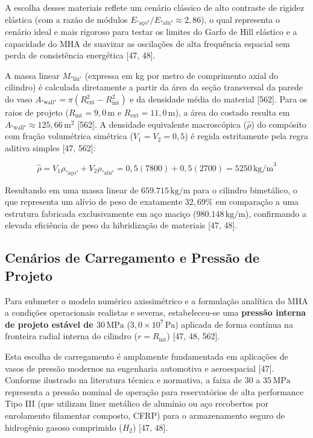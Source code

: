 A escolha desses materiais reflete um cenário clássico de alto contraste de rigidez elástica (com a razão de módulos $E_{\text{"aço"}}/E_{\text{"alu"}} \approx 2,86$), o qual representa o cenário ideal e mais rigoroso para testar os limites do Garfo de Hill elástico e a capacidade do MHA de suavizar as oscilações de alta frequência espacial sem perda de consistência energética [47, 48].

A massa linear $M_{\text{"lin"}}$ (expressa em kg por metro de comprimento axial do cilindro) é calculada diretamente a partir da área da seção transversal da parede do vaso $A_{\text{"wall"}} = \pi (R_{\text{ext}}^2 - R_{\text{int}}^2)$ e da densidade média do material [562]. Para os raios de projeto ($R_{\text{int}} = 9,0 \, \text{m}$ e $R_{\text{ext}} = 11,0 \, \text{m}$), a área do costado resulta em $A_{\text{"wall"}} \approx 125,66 \, \text{m}^2$ [562]. A densidade equivalente macroscópica ($\hat{\rho}$) do compósito com fração volumétrica simétrica ($V_1 = V_2 = 0,5$) é regida estritamente pela regra aditiva simples [47, 562]:

\begin{equation}
  \hat{\rho} = V_1 \rho_{\text{"aço"}} + V_2 \rho_{\text{"alu"}} = 0,5 (7800) + 0,5 (2700) = 5250 \, \text{kg/m}^3
  \label{eq:densidade_efetiva}
\end{equation}

Resultando em uma massa linear de $659.715 \, \text{kg/m}$ para o cilindro bimetálico, o que representa um alívio de peso de exatamente $32,69\%$ em comparação a uma estrutura fabricada exclusivamente em aço maciço ($980.148 \, \text{kg/m}$), confirmando a elevada eficiência de peso da hibridização de materiais [47, 48].

\subsection{Cenários de Carregamento e Pressão de Projeto}

Para submeter o modelo numérico axissimétrico e a formulação analítica do MHA a condições operacionais realistas e severas, estabeleceu-se uma \textbf{pressão interna de projeto estável de $30 \, \text{MPa}$} ($3,0 \times 10^7 \, \text{Pa}$) aplicada de forma contínua na fronteira radial interna do cilindro ($r = R_{\text{int}}$) [47, 48, 562].

Esta escolha de carregamento é amplamente fundamentada em aplicações de vasos de pressão modernos na engenharia automotiva e aeroespacial [47]. Conforme ilustrado na literatura técnica e normativa, a faixa de $30$ a $35 \, \text{MPa}$ representa a pressão nominal de operação para reservatórios de alta performance Tipo III (que utilizam liner metálico de alumínio ou aço recobertos por enrolamento filamentar composto, CFRP) para o armazenamento seguro de hidrogênio gasoso comprimido ($H_2$) [47, 48].

